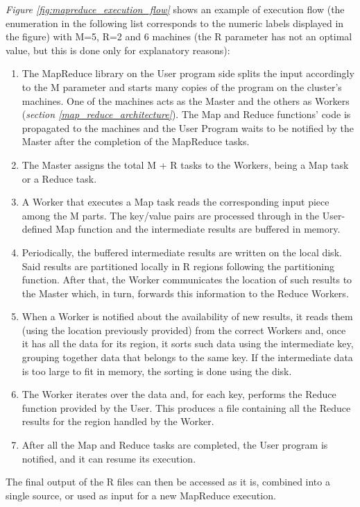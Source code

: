 \textit{Figure \ref{fig:mapreduce_execution_flow}} shows an example of execution flow (the enumeration in the following list corresponds to the numeric labels displayed in the figure) with M=5, R=2 and 6 machines (the R parameter has not an optimal value, but this is done only for explanatory reasons):
\begin{enumerate}
    \item The MapReduce library on the User program side splits the input accordingly to the M parameter and starts many copies of the program on the cluster's machines. One of the machines acts as the Master and the others as Workers (\textit{section \ref{map_reduce_architecture}}). The Map and Reduce functions' code is propagated to the machines and the User Program waits to be notified by the Master after the completion of the MapReduce tasks.
    \item The Master assigns the total M + R tasks to the Workers, being a Map task or a Reduce task.
    \item A Worker that executes a Map task reads the corresponding input piece among the M parts. The key/value pairs are processed through in the User-defined Map function and the intermediate results are buffered in memory.
    \item Periodically, the buffered intermediate results are written on the local disk. Said results are partitioned locally in R regions following the partitioning function. After that, the Worker communicates the location of such results to the Master which, in turn, forwards this information to the Reduce Workers.
    \item When a Worker is notified about the availability of new results, it reads them (using the location previously provided) from the correct Workers and, once it has all the data for its region, it sorts such data using the intermediate key, grouping together data that belongs to the same key. If the intermediate data is too large to fit in memory, the sorting is done using the disk.
    \item The Worker iterates over the data and, for each key, performs the Reduce function provided by the User. This produces a file containing all the Reduce results for the region handled by the Worker.
    \item After all the Map and Reduce tasks are completed, the User program is notified, and it can resume its execution.
\end{enumerate}

The final output of the R files can then be accessed as it is, combined into a single source, or used as input for a new MapReduce execution.